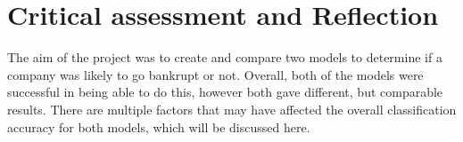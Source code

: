 \documentclass[11pt]{article}
\begin{document}
% 
 


\newpage
\section{Critical assessment and Reflection }
The aim of the project was to create and compare two models to determine if a company was likely to go bankrupt or not. Overall, both of the models were successful in being able to do this, however both gave different, but comparable results. 
There are multiple factors that may have affected the overall classification accuracy for both models, which will be discussed here. \\
\end{document}
